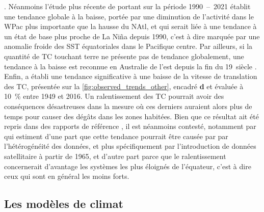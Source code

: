 \documentclass[../main.tex]{subfiles}
\begin{document}
\parencite{webster_changes_2005,maue_recent_2011,wang_climate_2010,seneviratne_weather_2021}. Néanmoins l'étude plus récente de \cite{klotzbach_trends_2022}
portant sur la période \num{1990}~--~\num{2021} établit une tendance globale à la baisse, portée par une diminution de l'activité dans le WPac plus importante
que la hausse du NAtl, et qui serait liée à une tendance à un état de base plus proche de La Niña depuis \num{1990}, c'est à dire marquée par une anomalie
froide des SST équatoriales dans le Pacifique centre. Par ailleurs, si la quantité de TC touchant terre ne présente pas de tendance globalement, une tendance à
la baisse est reconnue en Australie de l'est depuis la fin du \num{19}\ieme~siècle \parencite{knutson_tropical_2019,callaghan_variability_2011}. Enfin,
\cite{kossin_global_2018,kossin_reply_2019} a établi une tendance significative à une baisse de la vitesse de translation des TC, présentée sur la
\cref{fig:observed_trends_other}, encadré \textbf{d} et évaluée à \SI{10}{\percent} entre \num{1949} et \num{2016}. Un ralentissement des TC pourrait avoir des
conséquences désastreuses dans la mesure où ces derniers auraient alors plus de temps pour causer des dégâts dans les zones habitées. Bien que ce résultat ait
été repris dans des rapports de référence \parencite{knutson_tropical_2019,seneviratne_weather_2021}, il est néanmoins contesté, notamment par
\cite{lanzante_uncertainties_2019,moon_climate_2019} qui estiment d'une part que cette tendance pourrait être causée par par l'hétérogénéité des données, et
plus spécifiquement par l'introduction de données satellitaire à partir de \num{1965}, et d'autre part parce que le ralentissement concernerait d'avantage les
systèmes les plus éloignés de l'équateur, c'est à dire ceux qui sont en général les moins forts.

\subsection{Les modèles de climat}\label{sec:modèles}
\end{document}

